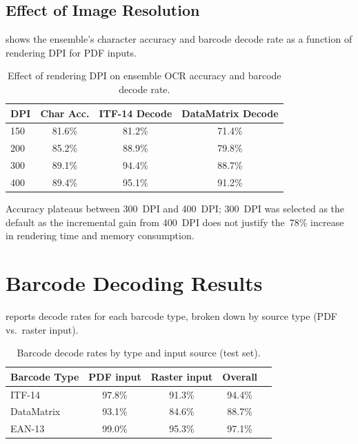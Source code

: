 \subsection{Effect of Image Resolution}

 shows the ensemble's character accuracy and barcode decode rate
as a function of rendering DPI for PDF inputs.

\begin{table}[h]
\centering
\caption{Effect of rendering DPI on ensemble OCR accuracy and barcode decode rate.}
\label{tab:dpi_effect}
\begin{tabular}{lccc}
\toprule
\textbf{DPI} & \textbf{Char Acc.} & \textbf{ITF-14 Decode} & \textbf{DataMatrix Decode} \\
\midrule
150 & 81.6\% & 81.2\% & 71.4\% \\
200 & 85.2\% & 88.9\% & 79.8\% \\
300 & 89.1\% & 94.4\% & 88.7\% \\
400 & 89.4\% & 95.1\% & 91.2\% \\
\bottomrule
\end{tabular}
\end{table}

Accuracy plateaus between 300~DPI and 400~DPI; 300~DPI was selected as the default as
the incremental gain from 400~DPI does not justify the~78\% increase in rendering time
and memory consumption.

\section{Barcode Decoding Results}

 reports decode rates for each barcode type, broken down by
source type (PDF vs.\ raster input).

\begin{table}[h]
\centering
\caption{Barcode decode rates by type and input source (test set).}
\label{tab:barcode_results}
\begin{tabular}{lcccc}
\toprule
\textbf{Barcode Type} & \textbf{PDF input} & \textbf{Raster input} & \textbf{Overall} \\
\midrule
ITF-14      & 97.8\% & 91.3\% & 94.4\% \\
DataMatrix  & 93.1\% & 84.6\% & 88.7\% \\
EAN-13      & 99.0\% & 95.3\% & 97.1\% \\
\bottomrule
\end{tabular}
\end{table}

